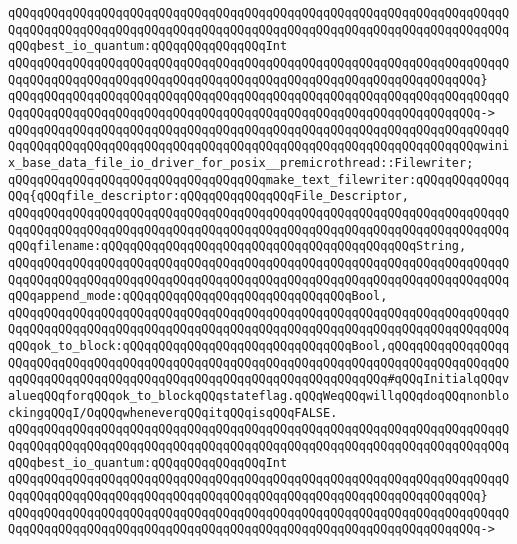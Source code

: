 \verb|qQQqqQQqqQQqqQQqqQQqqQQqqQQqqQQqqQQqqQQqqQQqqQQqqQQqqQQqqQQqqQQqqQQqqQQqqQQqqQQqqQQqqQQqqQQqqQQqqQQqqQQqqQQqqQQqqQQqqQQqqQQqqQQqqQQqqQQqqQQqqQQqbest_io_quantum:qQQqqQQqqQQqqQQqInt|\newline
\verb|qQQqqQQqqQQqqQQqqQQqqQQqqQQqqQQqqQQqqQQqqQQqqQQqqQQqqQQqqQQqqQQqqQQqqQQqqQQqqQQqqQQqqQQqqQQqqQQqqQQqqQQqqQQqqQQqqQQqqQQqqQQqqQQqqQQqqQQq}|\newline
\verb|qQQqqQQqqQQqqQQqqQQqqQQqqQQqqQQqqQQqqQQqqQQqqQQqqQQqqQQqqQQqqQQqqQQqqQQqqQQqqQQqqQQqqQQqqQQqqQQqqQQqqQQqqQQqqQQqqQQqqQQqqQQqqQQqqQQqqQQq->|\newline
\verb|qQQqqQQqqQQqqQQqqQQqqQQqqQQqqQQqqQQqqQQqqQQqqQQqqQQqqQQqqQQqqQQqqQQqqQQqqQQqqQQqqQQqqQQqqQQqqQQqqQQqqQQqqQQqqQQqqQQqqQQqqQQqqQQqqQQqqQQqwinix_base_data_file_io_driver_for_posix__premicrothread::Filewriter;|\newline
\newline
\verb|qQQqqQQqqQQqqQQqqQQqqQQqqQQqqQQqqQQqmake_text_filewriter:qQQqqQQqqQQqqQQq{qQQqfile_descriptor:qQQqqQQqqQQqqQQqFile_Descriptor,|\newline
\verb|qQQqqQQqqQQqqQQqqQQqqQQqqQQqqQQqqQQqqQQqqQQqqQQqqQQqqQQqqQQqqQQqqQQqqQQqqQQqqQQqqQQqqQQqqQQqqQQqqQQqqQQqqQQqqQQqqQQqqQQqqQQqqQQqqQQqqQQqqQQqqQQqfilename:qQQqqQQqqQQqqQQqqQQqqQQqqQQqqQQqqQQqqQQqqQQqString,|\newline
\verb|qQQqqQQqqQQqqQQqqQQqqQQqqQQqqQQqqQQqqQQqqQQqqQQqqQQqqQQqqQQqqQQqqQQqqQQqqQQqqQQqqQQqqQQqqQQqqQQqqQQqqQQqqQQqqQQqqQQqqQQqqQQqqQQqqQQqqQQqqQQqqQQqappend_mode:qQQqqQQqqQQqqQQqqQQqqQQqqQQqqQQqBool,|\newline
\verb|qQQqqQQqqQQqqQQqqQQqqQQqqQQqqQQqqQQqqQQqqQQqqQQqqQQqqQQqqQQqqQQqqQQqqQQqqQQqqQQqqQQqqQQqqQQqqQQqqQQqqQQqqQQqqQQqqQQqqQQqqQQqqQQqqQQqqQQqqQQqqQQqok_to_block:qQQqqQQqqQQqqQQqqQQqqQQqqQQqqQQqBool,qQQqqQQqqQQqqQQqqQQqqQQqqQQqqQQqqQQqqQQqqQQqqQQqqQQqqQQqqQQqqQQqqQQqqQQqqQQqqQQqqQQqqQQqqQQqqQQqqQQqqQQqqQQqqQQqqQQqqQQqqQQqqQQqqQQqqQQqqQQq#qQQqInitialqQQqvalueqQQqforqQQqok_to_blockqQQqstateflag.qQQqWeqQQqwillqQQqdoqQQqnonblockingqQQqI/OqQQqwheneverqQQqitqQQqisqQQqFALSE.|\newline
\verb|qQQqqQQqqQQqqQQqqQQqqQQqqQQqqQQqqQQqqQQqqQQqqQQqqQQqqQQqqQQqqQQqqQQqqQQqqQQqqQQqqQQqqQQqqQQqqQQqqQQqqQQqqQQqqQQqqQQqqQQqqQQqqQQqqQQqqQQqqQQqqQQqbest_io_quantum:qQQqqQQqqQQqqQQqInt|\newline
\verb|qQQqqQQqqQQqqQQqqQQqqQQqqQQqqQQqqQQqqQQqqQQqqQQqqQQqqQQqqQQqqQQqqQQqqQQqqQQqqQQqqQQqqQQqqQQqqQQqqQQqqQQqqQQqqQQqqQQqqQQqqQQqqQQqqQQqqQQq}|\newline
\verb|qQQqqQQqqQQqqQQqqQQqqQQqqQQqqQQqqQQqqQQqqQQqqQQqqQQqqQQqqQQqqQQqqQQqqQQqqQQqqQQqqQQqqQQqqQQqqQQqqQQqqQQqqQQqqQQqqQQqqQQqqQQqqQQqqQQqqQQq->|\newline
